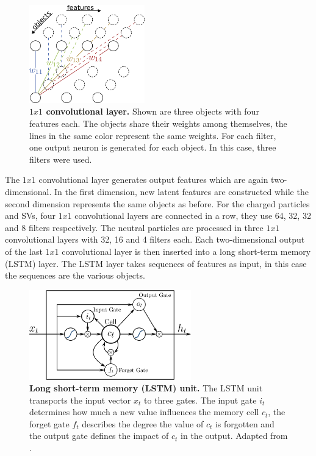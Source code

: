 \begin{figure}
\centering
\includegraphics[width=5cm]{chapter_5_tagging/convolutional.png}
\caption[$1x1$ Convolutional Layer and LSTM Unit]{\textbf{$1x1$ convolutional layer.} Shown are three objects with four features each. The objects share their weights among themselves, the lines in the same color represent the same weights. For each filter, one output neuron is generated for each object. In this case, three filters were used.}
\label{fig:ch_5_Conv}
\end{figure}

The $1x1$ convolutional layer generates output features which are again two-dimensional. In the first dimension, new latent features are constructed while the second dimension represents the same objects as before. For the charged particles and SVs, four $1x1$ convolutional layers are connected in a row, they use 64, 32, 32 and 8 filters respectively. The neutral particles are processed in three $1x1$ convolutional layers with 32, 16 and 4 filters each. Each two-dimensional output of the last $1x1$ convolutional layer is then inserted into a long short-term memory (LSTM) \cite{LSTM} layer. The LSTM layer takes sequences of features as input, in this case the sequences are the various objects.\\

\begin{figure}
\centering
\includegraphics[width=7cm]{chapter_5_tagging/lstm.png}
\caption[Long Short-Term Memory Unit]{\textbf{Long short-term memory (LSTM) unit.} The LSTM unit transports the input vector $x_t$ to three gates. The input gate $i_t$ determines how much a new value influences the memory cell $c_t$, the forget gate $f_t$ describes the degree the value of $c_t$ is forgotten and the output gate defines the impact of $c_t$ in the output. Adapted from \cite{LSTMunit}.}
\label{fig:ch_5_LSTM}
\end{figure}


